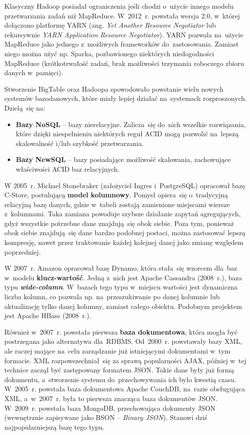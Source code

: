 \documentclass[12pt,a4paper,twoside,titlepage,openright]{book}
\begin{document}
Klasyczny Hadoop posiadał ograniczenia jeśli chodzi o~użycie innego modelu przetwarzania zadań niż MapReduce. W~2012~r. powstała wersja 2.0, w~której dołączono platformę YARN (ang. \textit{Yet Another Resource Negotiator} lub rekursywnie \textit{YARN Application Resource Negotiator}). YARN pozwala na~użycie MapReduce jako jednego z~możliwych frameworków do~zastosowania. Zamiast niego można użyć np. Sparka, pozbawionego niektórych niedogodności MapReduce (krótkotrwałość zadań, brak możliwości trzymania roboczego zbioru danych w~pamięci). \cite{hadoop, bigData}

Stworzenie BigTable oraz Hadoopa spowodowało powstanie wielu nowych systemów bazodanowych, które miały lepiej działać na~systemach rozproszonych. Dzielą~się na:
\begin{itemize}
\item \textbf{Bazy NoSQL} -- bazy nierelacyjne. Zalicza~się do~nich wszelkie rozwiązania, które dzięki niespełnieniu niektórych reguł ACID mogą pozwolić na~lepszą skalowalność i/lub szybkość przetwarzania.
\item \textbf{Bazy NewSQL} -- bazy posiadające możliwość skalowania, zachowujące właściwości ACID baz relacyjnych.
\end{itemize}

W 2005~r. Michael Stonebraker (założyciel Ingres i~PostgreSQL) opracował bazę C-Store, postulującą \textbf{model kolumnowy}. Pomysł opiera~się o~tradycyjną relacyjną bazę danych, gdzie w~tabeli zostają zamienione miejscami wiersze z~kolumnami. Taka zamiana powoduje szybsze działanie zapytań agregujących, gdyż wszystkie potrzebne dane znajdują~się obok siebie. Poza tym, ponieważ obok siebie znajdują~się dane bardzo podobnej postaci, można zastosować lepszą kompresję, nawet przez traktowanie każdej kolejnej danej jako zmianę względem poprzedniej.

W 2007~r. Amazon opracował bazę Dynamo, która stała~się wzorcem dla~baz w~modelu \textbf{klucz-wartość}. Jedną z~nich jest Apache Cassandra (2008~r.), baza typu \textit{\textbf{wide-column}}. W~bazach tego typu w~miejscu wartości jest dynamiczna liczba kolumn, co pozwala np. na~przeszukiwanie po danej kolumnie lub aktualizację tylko danej kolumny, zamiast całego obiektu. Podobnym projektem jest Apache HBase (2008~r.).

Również w~2007~r. powstała pierwsza \textbf{baza dokumentowa}, która mogła być postrzegana jako alternatywa dla~RDBMS. Od~2000~r. powstawały bazy XML, ale raczej mające na~celu zarządzanie już istniejącymi dokumentami w~tym formacie. XML rozpowszechniał~się za sprawą popularności AJAX, później w~tej technice zaczął być zastępowany formatem JSON. Takie dane były już formą dokumentu, a~stworzenie systemu do~przechowywania ich było kwestią czasu. W~2005~r. powstała baza dokumentowa Apache CouchDB, na~razie obsługująca XML, a~w~2007~r. była to pierwsza znacząca baza dokumentów JSON. W~2009~r. powstała baza MongoDB, przechowująca dokumenty JSON (wewnętrznie zapisywane jako BSON -- \textit{Binary JSON}). Stanowi dziś najpopularniejszą bazę tego typu.
\end{document}
